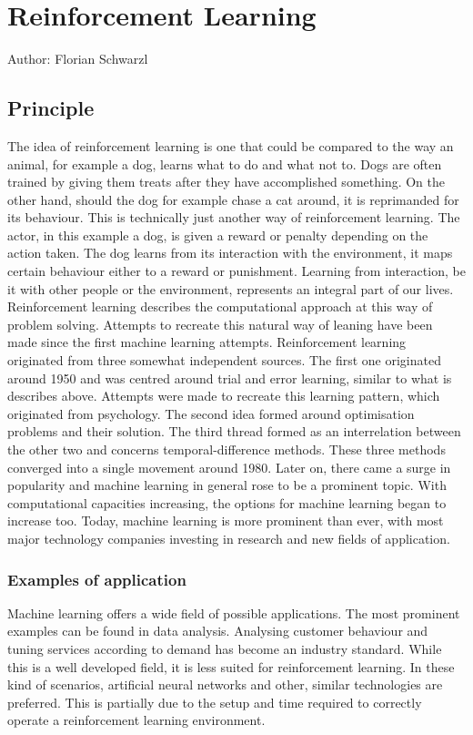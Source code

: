 \chapter{Reinforcement Learning}
Author: Florian Schwarzl

\section{Principle}
The idea of reinforcement learning is one that could be compared to the way an animal, for example a dog, learns what to do and what not to. Dogs are often trained by giving them treats after they have accomplished something. On the other hand, should the dog for example chase a cat around, it is reprimanded for its behaviour. This is technically just another way of reinforcement learning. The actor, in this example a dog, is given a reward or penalty depending on the action taken. The dog learns from its interaction with the environment, it maps certain behaviour either to a reward or punishment. Learning from interaction, be it with other people or the environment, represents an integral part of our lives. Reinforcement learning describes the computational approach at this way of problem solving. Attempts to recreate this natural way of leaning have been made since the first machine learning attempts. Reinforcement learning originated from three somewhat independent sources. The first one originated around 1950 and was centred around trial and error learning, similar to what is describes above. Attempts were made to recreate this learning pattern, which originated from psychology. The second idea formed around optimisation problems and their solution. The third thread formed as an interrelation between the other two and concerns temporal-difference methods. These three methods converged into a single movement around 1980. Later on, there came a surge in popularity and machine learning in general rose to be a prominent topic. With computational capacities increasing, the options for machine learning began to increase too. Today, machine learning is more prominent than ever, with most major technology companies investing in research and new fields of application.  %

\subsection{Examples of application} %
Machine learning offers a wide field of possible applications. The most prominent examples can be found in data analysis. Analysing customer behaviour and tuning services according to demand has become an industry standard. While this is a well developed field, it is less suited for reinforcement learning. In these kind of scenarios, artificial neural networks and other, similar technologies are preferred. This is partially due to the setup and time required to correctly operate a reinforcement learning environment.


